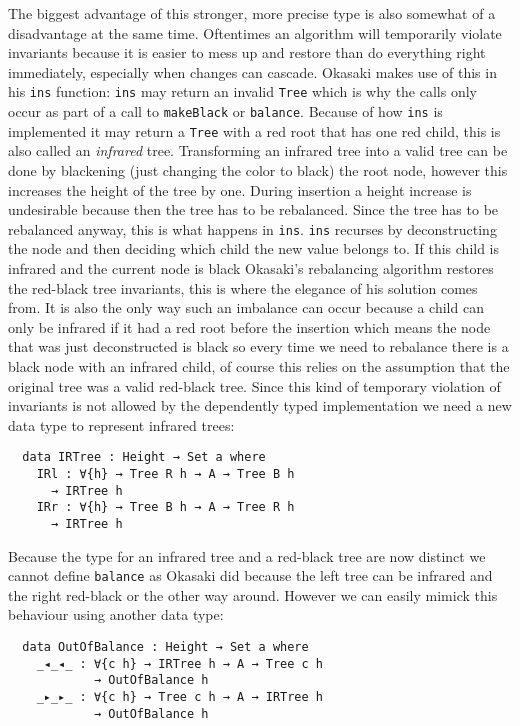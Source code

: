 \documentclass[journal, retainorgcmds]{IEEEtran}
\newcommand{\iagda}[1]{\texttt{#1}}
\newcommand{\ihask}[1]{\texttt{#1}}
\begin{document}
The biggest advantage of this stronger, more precise type is also somewhat of
a disadvantage at the same time.
Oftentimes an algorithm will temporarily violate invariants because it is
easier to mess up and restore than do everything right immediately, especially
when changes can cascade.
Okasaki makes use of this in his \ihask{ins} function: \ihask{ins} may return
an invalid \ihask{Tree} which is why the calls only occur as part of a call
to \ihask{makeBlack} or \ihask{balance}.
Because of how \ihask{ins} is implemented it may return a \ihask{Tree} with a
red root that has one red child, this is also called an \emph{infrared} tree.
Transforming an infrared tree into a valid tree can be done by blackening
(just changing the color to black) the root node, however this increases the
height of the tree by one.
During insertion a height increase is undesirable because then the tree has to
be rebalanced.
Since the tree has to be rebalanced anyway, this is what happens in \ihask{ins}.
\ihask{ins} recurses by deconstructing the node and then deciding which child
the new value belongs to.
If this child is infrared and the current node is black Okasaki's rebalancing
algorithm restores the red-black tree invariants, this is where the elegance
of his solution comes from.
It is also the only way such an imbalance can occur because a child can only be
infrared if it had a red root before the insertion which means the node that
was just deconstructed is black so every time we need to rebalance there is a
black node with an infrared child, of course this relies on the assumption that
the original tree was a valid red-black tree.
Since this kind of temporary violation of invariants is not allowed by the
dependently typed implementation we need a new data type to represent infrared
trees:

\begin{verbatim}
  data IRTree : Height → Set a where
    IRl : ∀{h} → Tree R h → A → Tree B h
      → IRTree h
    IRr : ∀{h} → Tree B h → A → Tree R h
      → IRTree h
\end{verbatim}

Because the type for an infrared tree and a red-black tree are now distinct we
cannot define \iagda{balance} as Okasaki did because the left tree can be
infrared and the right red-black or the other way around.
However we can easily mimick this behaviour using another data type:

\begin{verbatim}
  data OutOfBalance : Height → Set a where
    _◂_◂_ : ∀{c h} → IRTree h → A → Tree c h
            → OutOfBalance h
    _▸_▸_ : ∀{c h} → Tree c h → A → IRTree h
            → OutOfBalance h
\end{verbatim}
\end{document}
